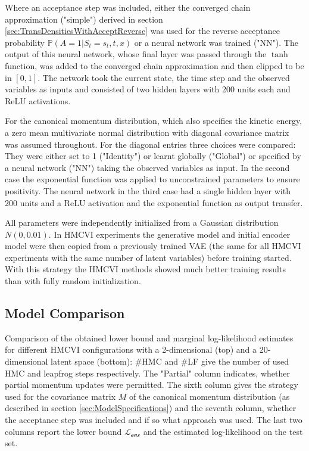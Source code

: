 Where an acceptance step was included, either the converged chain approximation ("simple") derived in section \ref{sec:TransDensitiesWithAcceptReverse} was used for the reverse acceptance probability $\mathbb{P}(A = 1|S_t = s_t, t, x)$ or a neural network was trained ("NN"). The output of this neural network, whose final layer was passed through the $\tanh$ function, was added to the converged chain approximation and then clipped to be in $[0, 1]$. The network took the current state, the time step and the observed variables as inputs and consisted of two hidden layers with 200 units each and ReLU activations.

For the canonical momentum distribution, which also specifies the kinetic energy, a zero mean multivariate normal distribution with diagonal covariance matrix was assumed throughout. For the diagonal entries three choices were compared: They were either set to 1 ("Identity") or learnt globally ("Global") or specified by a neural network ("NN") taking the observed variables as input. In the second case the exponential function was applied to unconstrained parameters to ensure positivity. The neural network in the third case had a single hidden layer with 200 units and a ReLU activation and the exponential function as output transfer.

All parameters were independently initialized from a Gaussian distribution $N(0, 0.01)$. In HMCVI experiments the generative model and initial encoder model were then copied from a previously trained VAE (the same for all HMCVI experiments with the same number of latent variables) before training started. With this strategy the HMCVI methods showed much better training results than with fully random initialization.

\subsection{Model Comparison}

\begin{table}[ht]
\centering

\caption{Comparison of the obtained lower bound and marginal log-likelihood estimates for different HMCVI configurations with a 2-dimensional (top) and a 20-dimensional latent space (bottom): \#HMC and \#LF give the number of used HMC and leapfrog steps respectively. The "Partial" column indicates, whether partial momentum updates were permitted. The sixth column gives the strategy used for the covariance matrix $M$ of the canonical momentum distribution (as described in section \ref{sec:ModelSpecifications}) and the seventh column, whether the acceptance step was included and if so what approach was used. The last two columns report the lower bound $\mathcal{L_\textrm{aux}}$ and the estimated log-likelihood on the test set.}
\label{tab:Results}
\end{table}

